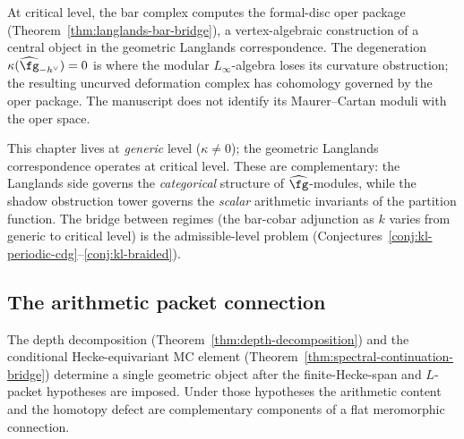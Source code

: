 \begin{remark}%
\label{rem:langlands-interface}%
%
At critical level, the bar complex computes the formal-disc oper
package
(Theorem~\ref{thm:langlands-bar-bridge}),
a vertex-algebraic construction of a central object in the
geometric Langlands correspondence. The degeneration
$\kappa(\widehat{\fg}_{-h^\vee}) = 0$ is where the modular
$L_\infty$-algebra loses its curvature obstruction; the
resulting uncurved deformation complex has cohomology governed
by the oper package. The manuscript does not identify its
Maurer--Cartan moduli with the oper space.

This chapter lives at \emph{generic} level
($\kappa \ne 0$); the geometric Langlands correspondence
operates at critical level. These are complementary: the
Langlands side governs the \emph{categorical} structure
of $\widehat{\fg}$-modules, while the shadow obstruction
tower governs the \emph{scalar} arithmetic invariants
of the partition function. The bridge between
regimes (the bar-cobar adjunction as $k$ varies from
generic to critical level) is the admissible-level problem
(Conjectures~\ref{conj:kl-periodic-cdg}--\ref{conj:kl-braided}).
\end{remark}

\subsection{The arithmetic packet connection}%
\label{subsec:arithmetic-packet-connection}%
%

The depth decomposition (Theorem~\ref{thm:depth-decomposition})
and the conditional Hecke-equivariant MC element
(Theorem~\ref{thm:spectral-continuation-bridge}) determine a single
geometric object after the finite-Hecke-span and $L$-packet
hypotheses are imposed. Under those hypotheses the arithmetic content
and the homotopy defect are complementary components of a flat
meromorphic connection.

